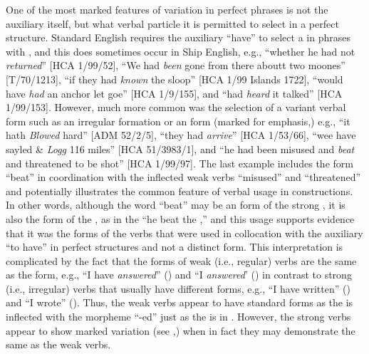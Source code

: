 One of the most marked features of variation in perfect  phrases is not the auxiliary itself, but what verbal particle it is permitted to select in a perfect structure. Standard English requires the auxiliary “have” to select a  in  phrases with , and this does sometimes occur in Ship English, e.g., “whether he had not \textit{returned}” [HCA 1/99/52], “We had \textit{been} gone from there aboutt two moones” [T/70/1213], “if they had \textit{known} the sloop” [HCA 1/99  Islands 1722], “would have \textit{had} an anchor let goe” [HCA 1/9/155], and “had \textit{heard} it talked” [HCA 1/99/153]. However, much more common was the selection of a variant verbal form such as an irregular formation or an  form (marked for emphasis,) e.g., “it hath \textit{Blowed} hard” [ADM 52/2/5], “they had \textit{arrive}” [HCA 1/53/66], “wee have sayled \& \textit{Logg} 116 miles” [HCA 51/3983/1], and “he had been misused and \textit{beat} and threatened to be shot” [HCA 1/99/97]. The last example includes the  form “beat” in coordination with the inflected weak verbs “misused” and “threatened” and potentially illustrates the common feature of  verbal usage in  constructions. In other words, although the word “beat” may be an  form of the strong , it is also the form of the , as in the  “he beat the ,” and this usage supports evidence that it was the  forms of the verbs that were used in collocation with the auxiliary “to have” in perfect structures and not a distinct  form. This interpretation is complicated by the fact that the  forms of weak (i.e., regular) verbs are the same as the  form, e.g., “I have \textit{answered}” () and “I \textit{answered}’ () in contrast to strong (i.e., irregular) verbs that usually have different  forms, e.g., “I have written” () and “I wrote” (). Thus, the weak verbs appear to have standard  forms as the  is inflected with the morpheme “-ed” just as the  is in . However, the strong verbs appear to show marked variation (see ,) when in fact they may demonstrate the same  as the weak verbs. 

